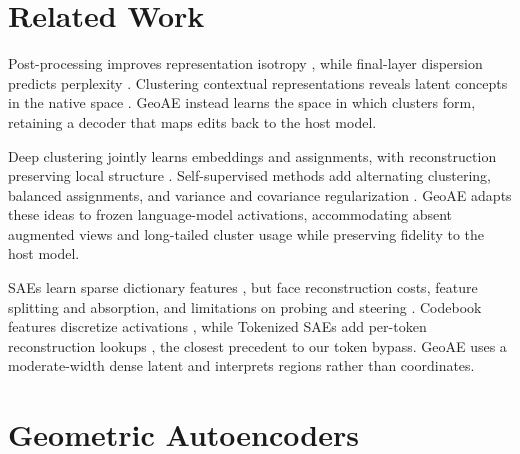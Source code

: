 \documentclass[11pt]{article}
\begin{document}
\section{Related Work}
\label{sec:related}

Post-processing improves representation isotropy \citep{mu2018all,li2020sentence,su2021whitening}, while final-layer dispersion predicts perplexity \citep{li2026predictive}. Clustering contextual representations reveals latent concepts in the native space \citep{dalvi2022discovering,sajjad2022analyzing,mousi2023can}. GeoAE instead learns the space in which clusters form, retaining a decoder that maps edits back to the host model.

Deep clustering jointly learns embeddings and assignments, with reconstruction preserving local structure \citep{xie2016unsupervised,yang2017towards,guo2017improved}. Self-supervised methods add alternating clustering, balanced assignments, and variance and covariance regularization \citep{caron2018deep,asano2020sela,caron2020swav,bardes2022vicreg}. GeoAE adapts these ideas to frozen language-model activations, accommodating absent augmented views and long-tailed cluster usage while preserving fidelity to the host model.

SAEs learn sparse dictionary features \citep{bricken2023monosemanticity,cunningham2024sparse,gao2025scaling,lieberum2024gemma,mcdougall2025gemma}, but face reconstruction costs, feature splitting and absorption, and limitations on probing and steering \citep{engels2025decomposing,chanin2025absorption,leask2025sparse,kantamneni2025sparse,wu2025axbench}. Codebook features discretize activations \citep{tamkin2023codebook}, while Tokenized SAEs add per-token reconstruction lookups \citep{dooms2025tokenized}, the closest precedent to our token bypass. GeoAE uses a moderate-width dense latent and interprets regions rather than coordinates.

\section{Geometric Autoencoders}
\label{sec:method}
\end{document}
